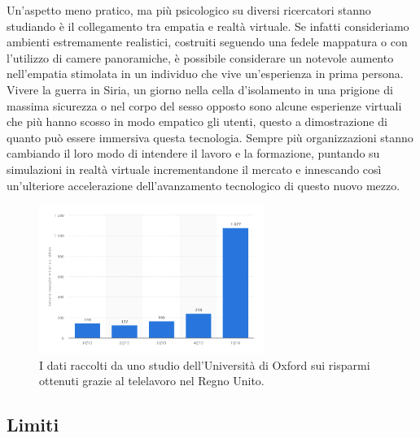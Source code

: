Un'aspetto meno pratico, ma più psicologico su diversi ricercatori stanno studiando è il  collegamento tra empatia e realtà virtuale. Se infatti consideriamo ambienti estremamente realistici, costruiti seguendo una fedele mappatura o con l'utilizzo di camere panoramiche, è possibile considerare un notevole aumento nell'empatia stimolata in un individuo che vive un'esperienza in prima persona. Vivere la guerra in Siria, un giorno  nella cella d'isolamento in una prigione di massima sicurezza o nel corpo del sesso opposto sono alcune esperienze virtuali che più hanno scosso in modo empatico gli utenti,
questo a dimostrazione di quanto può essere immersiva questa tecnologia.
Sempre più organizzazioni stanno cambiando il loro modo di intendere il lavoro e la formazione, puntando su simulazioni in realtà virtuale incrementandone il mercato e innescando così un'ulteriore accelerazione dell'avanzamento tecnologico di questo nuovo mezzo. 
\begin{figure}[H]
	\includegraphics[width=0.65\textwidth]{figure/investimenti}
	\centering
	\caption{I dati raccolti da uno studio dell'Università di Oxford sui risparmi ottenuti grazie al telelavoro nel Regno Unito.}
\end{figure}

\subsection{Limiti}

